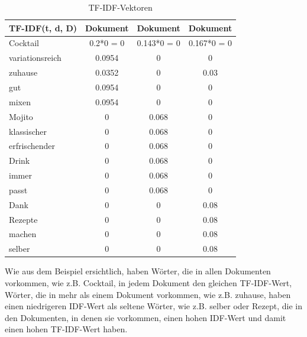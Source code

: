 \begin{table}[H]
    \centering
    \begin{tabular}{l|c|c|c}
        TF-IDF(t, d, D)          & Dokument \textnumero 1 & Dokument \textnumero 2 & Dokument \textnumero 3 \\
        \hline
        Cocktail            & 0.2*0 = 0             & 0.143*0 = 0      & 0.167*0 = 0 \\
        \hline
        variationsreich & 0.0954             & 0 & 0      \\
        \hline
        zuhause                & 0.0352           & 0    & 0.03 \\
        \hline
        gut                  & 0.0954             & 0      & 0  \\
        \hline
        mixen            & 0.0954             & 0      & 0 \\
        \hline
        Mojito & 0             & 0.068 & 0      \\
        \hline
        klassischer                & 0           & 0.068    & 0 \\
        \hline
        erfrischender                  & 0             & 0.068      & 0   \\
        \hline
        Drink            & 0             & 0.068      & 0 \\
        \hline
        immer & 0             & 0.068 & 0      \\
        \hline
        passt                & 0          & 0.068    & 0 \\
        \hline
        Dank                  & 0             & 0      & 0.08   \\
        \hline
        Rezepte            & 0             & 0      & 0.08 \\
        \hline
        machen & 0             & 0 & 0.08      \\
        \hline
        selber                & 0           & 0    & 0.08\\
    \end{tabular}
    \caption{\label{table:TFIDF_Vektoren}TF-IDF-Vektoren}
\end{table}
\noindent
Wie aus dem Beispiel ersichtlich, haben Wörter, die in allen Dokumenten vorkommen, wie z.B. \glqq Cocktail\grqq{}, in jedem Dokument den gleichen \ac{TF-IDF}-Wert, Wörter, die in mehr als einem Dokument vorkommen, wie z.B. \glqq zuhause\grqq{}, haben einen niedrigeren \ac{IDF}-Wert als seltene Wörter, wie z.B. \glqq selber\grqq{} oder \glqq{}Rezept\grqq{}, die in den Dokumenten, in denen sie vorkommen, einen hohen \ac{IDF}-Wert und damit einen hohen \ac{TF-IDF}-Wert haben. 
